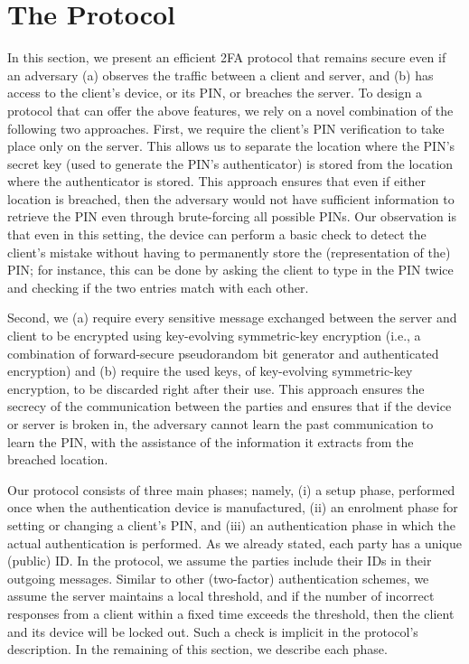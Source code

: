 \documentclass[runningheads]{llncs}
\begin{document}
\section{The Protocol}\label{sec::the-protocol}

In this section, we present an efficient 2FA protocol that remains secure even if an adversary (a) observes the traffic between a client and server, and (b) has access to the client’s device, or its PIN, or breaches the server. To design a protocol that can offer the above features, we rely on a novel combination of the following two approaches. First, we require the client's  PIN verification to take place only on the server. This allows us to separate the location where the PIN's secret key (used to generate the PIN's authenticator) is stored from the location where the authenticator is stored. This approach ensures that even if either location is breached, then the adversary would not have sufficient information to retrieve the PIN even through brute-forcing all possible PINs. Our observation is that even in this setting, the device can perform a basic check to detect the client's mistake without having to permanently store the (representation of the) PIN; for instance, this can be done by asking the client to type in the PIN twice and checking if the two entries match with each other. 



Second, we (a) require every sensitive message exchanged between the server and client to be encrypted using key-evolving symmetric-key encryption (i.e., a combination of forward-secure pseudorandom bit generator and authenticated encryption) and (b) require the used keys, of key-evolving symmetric-key encryption, to be discarded right after their use. This approach ensures the secrecy of the communication between the parties and ensures that if the device or server is broken in, the adversary cannot learn the past communication to learn the PIN, with the assistance of the information it extracts from the breached location. 



Our protocol consists of three main phases; namely, (i) a setup phase, performed once when the authentication device is manufactured, (ii) an enrolment phase for setting or changing a client's PIN, and (iii) an authentication phase in which the actual authentication is performed. As we already stated, each party has a unique (public) ID. In the protocol, we assume the parties include their IDs in their outgoing messages.  Similar to other (two-factor) authentication schemes, we assume the server maintains a local threshold, and if the number of incorrect responses from a client within a fixed time exceeds the threshold, then the client and its device will be locked out. Such a check is implicit in the protocol's description. In the remaining of this section, we describe each phase. 
\end{document}
